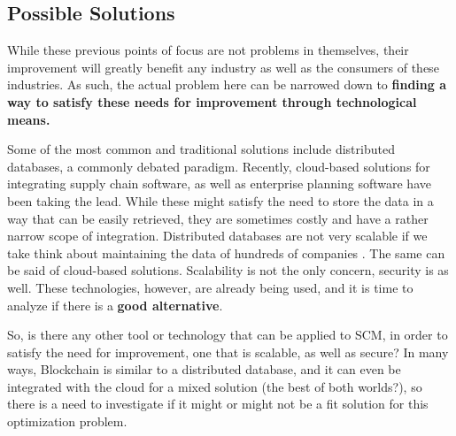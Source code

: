 \subsection{Possible Solutions}
While these previous points of focus are not problems in themselves, their improvement will greatly benefit any industry as well as the consumers of these industries. As such, the actual problem here can be narrowed down to \textbf{finding a way to satisfy these needs for improvement through technological means.}

Some of the most common and traditional solutions include distributed databases, a commonly debated paradigm.  Recently, cloud-based solutions for integrating supply chain software, as well as enterprise planning software have been taking the lead.  While these might satisfy the need to store the data in a way that can be easily retrieved, they are sometimes costly and have a rather narrow scope of integration. Distributed databases are not very scalable if we take think about maintaining the data of hundreds of companies . The same can be said of cloud-based solutions. Scalability is not the only concern, security is as well. These technologies, however, are already being used, and it is time to analyze if there is a \textbf {good alternative}.%

So, is there any other tool or technology that can be applied to SCM, in order to satisfy the need for improvement, one that is scalable, as well as secure?
In many ways, Blockchain is similar to a distributed database, and it can even be integrated with the cloud for a mixed solution (the best of both worlds?), so there is a need to investigate if it might or might not be a fit solution for this optimization problem.


